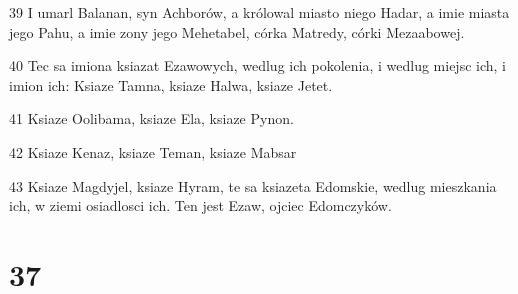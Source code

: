 \par 39 I umarl Balanan, syn Achborów, a królowal miasto niego Hadar, a imie miasta jego Pahu, a imie zony jego Mehetabel, córka Matredy, córki Mezaabowej.
\par 40 Tec sa imiona ksiazat Ezawowych, wedlug ich pokolenia, i wedlug miejsc ich, i imion ich: Ksiaze Tamna, ksiaze Halwa, ksiaze Jetet.
\par 41 Ksiaze Oolibama, ksiaze Ela, ksiaze Pynon.
\par 42 Ksiaze Kenaz, ksiaze Teman, ksiaze Mabsar
\par 43 Ksiaze Magdyjel, ksiaze Hyram, te sa ksiazeta Edomskie, wedlug mieszkania ich, w ziemi osiadlosci ich. Ten jest Ezaw, ojciec Edomczyków.

\chapter{37}

